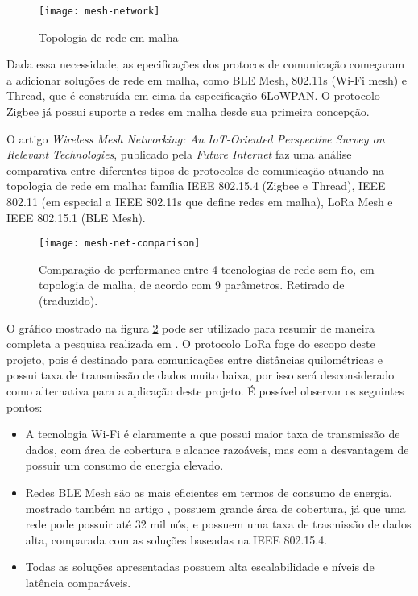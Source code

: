\documentclass[../monografia.tex]{subfiles}
\begin{document}
\begin{figure}[h!]
\centering
	\texttt{[image: mesh-network]}
	\caption{Topologia de rede em malha}
	\label{fig:Rede em malha}
\end{figure}

Dada essa necessidade, as epecificações dos protocos de comunicação começaram a adicionar soluções de rede em malha, como BLE Mesh, 802.11s (Wi-Fi mesh) e Thread, que é construída em cima da especificação 6LoWPAN. O protocolo Zigbee já possui suporte a redes em malha desde sua primeira concepção.

O artigo \textit{Wireless Mesh Networking: An IoT-Oriented Perspective Survey on Relevant Technologies}, publicado pela \textit{Future Internet}\cite{mesh-net-comparison} faz uma análise comparativa entre diferentes tipos de protocolos de comunicação atuando na topologia de rede em malha: família IEEE 802.15.4 (Zigbee e Thread), IEEE 802.11 (em especial a IEEE 802.11s que define redes em malha), LoRa Mesh e IEEE 802.15.1 (BLE Mesh).

\begin{figure}[h!]
\centering
	\texttt{[image: mesh-net-comparison]}
	\caption{
		Comparação de performance entre 4 tecnologias de rede sem fio, em topologia de malha, de acordo com 9 parâmetros. Retirado de \cite{mesh-net-comparison} (traduzido).
	}
	\label{fig:Comparação redes mesh}
\end{figure}

O gráfico mostrado na figura \ref{fig:Comparação redes mesh}  pode ser utilizado para resumir de maneira completa a pesquisa realizada em \cite{mesh-net-comparison}. O protocolo LoRa foge do escopo deste projeto, pois é destinado para comunicações entre distâncias quilométricas e possui taxa de transmissão de dados muito baixa, por isso será desconsiderado como alternativa para a aplicação deste projeto. É possível observar os seguintes pontos:

\begin{itemize}
	\item A tecnologia Wi-Fi é claramente a que possui maior taxa de transmissão de dados, com área de cobertura e alcance razoáveis, mas com a desvantagem de possuir um consumo de energia elevado.
	\item Redes BLE Mesh são as mais eficientes em termos de consumo de energia, mostrado também no artigo \cite{zigbee-ble-power}, possuem grande área de cobertura, já que uma rede pode possuir até 32 mil nós\cite{BLE-mesh}, e possuem uma taxa de trasmissão de dados alta, comparada com as soluções baseadas na IEEE 802.15.4.
	\item Todas as soluções apresentadas possuem alta escalabilidade e níveis de latência comparáveis.
\end{itemize}
\end{document}

